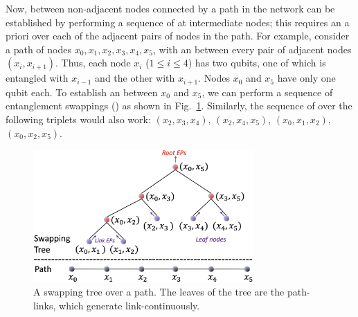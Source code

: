 Now, \eps between non-adjacent nodes connected by a path in the network 
can be established by 
performing a sequence of \ess at 
intermediate nodes; this requires an a priori \eps over 
each of the adjacent pairs of nodes in the path.
For example, consider a path of nodes $x_0, x_1, x_2, x_3, x_4, x_5$, with an \eps 
between every pair of adjacent nodes $(x_i, x_{i+1})$. Thus, each node $x_i$
($1 \leq i \leq 4$) has two qubits, one of which is entangled with $x_{i-1}$ 
and the other with
$x_{i+1}$. Nodes $x_0$ and $x_5$ have only one qubit each.
To establish an \eps 
between $x_0$ and $x_5$, we can perform a sequence of entanglement
swappings (\ess) as shown in Fig.~\ref{fig:swapping_tree}. 
Similarly, the sequence of \es over the following triplets would also 
work: $(x_2, x_3, x_4)$, $(x_2, x_4, x_5)$, $(x_0, x_1, x_2)$, 
$(x_0, x_2, x_5)$. 

\begin{figure}[h]
    \centering
    \includegraphics[width=0.75\textwidth]{chapters/tqe/figures/swapping_tree.jpg}
    \caption{A swapping tree over a path. The leaves of the tree are the path-links, which generate link-\epss continuously.}
\label{fig:swapping_tree}
\end{figure}

